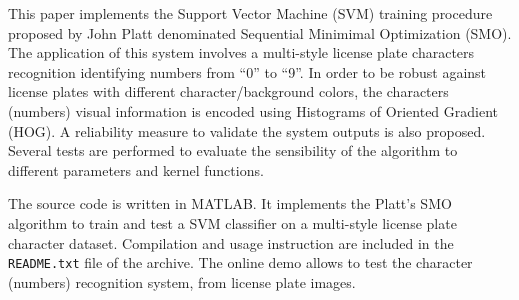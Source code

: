 \documentclass{ipol}
\begin{document}



\begin{ipolAbstract}
This paper implements the Support Vector Machine (SVM) training procedure proposed by John Platt denominated Sequential Minimimal Optimization (SMO).
The application of this system involves a multi-style license plate characters recognition identifying numbers from ``0'' to ``9''.
In order to be robust against license plates with different character/background colors, the characters (numbers) visual information is encoded using Histograms of Oriented Gradient (HOG).
A reliability measure to validate the system outputs is also proposed.
Several tests are performed to evaluate the sensibility of the algorithm to different parameters and kernel functions.
\end{ipolAbstract}


\begin{ipolCode}
The source code is written in MATLAB.
It implements the Platt's SMO algorithm to train and test a SVM classifier on a multi-style license plate character dataset.
Compilation and usage instruction are included in the \verb|README.txt| file of the archive.
The online demo allows to test the character (numbers) recognition system, from license plate images. 
\end{ipolCode}
\end{document}
